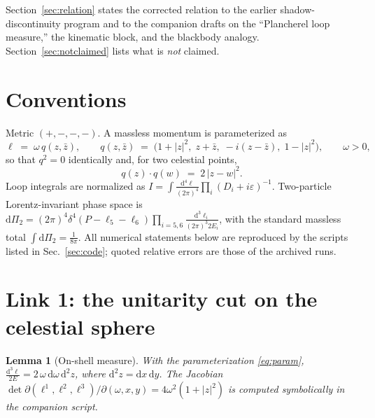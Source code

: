 \documentclass[12pt,a4paper]{article}
\theoremstyle{plain}
\newtheorem{lemma}[theorem]{Lemma}
\theoremstyle{definition}
\theoremstyle{remark}
\newcommand{\dd}{\mathrm{d}}
\newcommand{\dLIPS}{\dd\Pi_2}
\begin{document}
Section~\ref{sec:relation} states the corrected relation to the earlier
shadow-discontinuity program and to the companion drafts on the
``Plancherel loop measure,'' the kinematic block, and the blackbody
analogy.  Section~\ref{sec:notclaimed} lists what is \emph{not} claimed.

\section{Conventions}
\label{sec:conventions}

Metric $(+,-,-,-)$.  A massless momentum is parameterized as
\begin{equation}
\ell \;=\; \omega\, q(z,\bar z),\qquad
q(z,\bar z) \;=\; \bigl(1+|z|^2,\; z+\bar z,\; -i(z-\bar z),\;
1-|z|^2\bigr),\qquad \omega>0,
\label{eq:param}
\end{equation}
so that $q^2=0$ identically and, for two celestial points,
\begin{equation}
q(z)\cdot q(w) \;=\; 2\,|z-w|^2 .
\label{eq:qq}
\end{equation}
Loop integrals are normalized as $I=\int
\frac{\dd^4\ell}{(2\pi)^4}\prod_i (D_i+i\varepsilon)^{-1}$.  Two-particle
Lorentz-invariant phase space is
$\dLIPS=(2\pi)^4\delta^4(P-\ell_5-\ell_6)\prod_{i=5,6}
\frac{\dd^3\ell_i}{(2\pi)^3 2E_i}$, with the standard massless total
$\int\dLIPS=\tfrac{1}{8\pi}$.  All numerical statements below are
reproduced by the scripts listed in Sec.~\ref{sec:code}; quoted
relative errors are those of the archived runs.

\section{Link 1: the unitarity cut on the celestial sphere}
\label{sec:link1}

\begin{lemma}[On-shell measure]
\label{lem:onshell}
With the parameterization \eqref{eq:param},
$\displaystyle \frac{\dd^3\ell}{2E} = 2\,\omega\,\dd\omega\,\dd^2z$,
where $\dd^2z=\dd x\,\dd y$.  The Jacobian
$\det \partial(\ell^1,\ell^2,\ell^3)/\partial(\omega,x,y)
=4\omega^2(1+|z|^2)$ is computed symbolically in the companion script.
\end{lemma}
\end{document}
